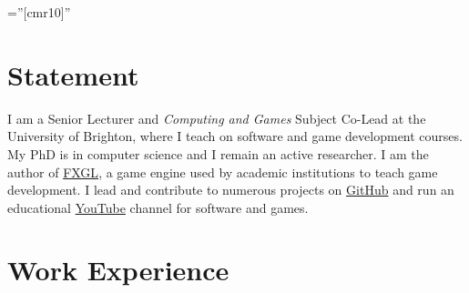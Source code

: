 \documentclass[a4paper,11pt]{article} %
\begin{document}
\pagestyle{empty} %

\font\fb=''[cmr10]'' %


\par{\bigskip\par} %

\section{Statement}

I am a Senior Lecturer and \textit{Computing and Games} Subject Co-Lead at the University of Brighton, where I teach on software and game development courses.
My PhD is in computer science and I remain an active researcher.
I am the author of \href{https://github.com/AlmasB/FXGL}{FXGL}, a game engine used by academic institutions to teach game development.
I lead and contribute to numerous projects on \href{https://github.com/AlmasB}{GitHub} and run an educational \href{https://www.youtube.com/almasb0/videos}{YouTube} channel for software and games.


\section{Work Experience}
\end{document}
